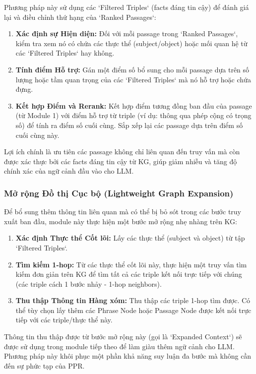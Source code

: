 \documentclass[../main.tex]{subfiles}
\begin{document}
Phương pháp này sử dụng các `Filtered Triples` (facts đáng tin cậy) để đánh giá lại và điều chỉnh thứ hạng của `Ranked Passages`:
\begin{enumerate}
    \item \textbf{Xác định sự Hiện diện:} Đối với mỗi passage trong `Ranked Passages`, kiểm tra xem nó có chứa các thực thể (subject/object) hoặc mối quan hệ từ các `Filtered Triples` hay không.
    \item \textbf{Tính điểm Hỗ trợ:} Gán một điểm số bổ sung cho mỗi passage dựa trên số lượng hoặc tầm quan trọng của các `Filtered Triples` mà nó hỗ trợ hoặc chứa đựng.
    \item \textbf{Kết hợp Điểm và Rerank:} Kết hợp điểm tương đồng ban đầu của passage (từ Module 1) với điểm hỗ trợ từ triple (ví dụ: thông qua phép cộng có trọng số) để tính ra điểm số cuối cùng. Sắp xếp lại các passage dựa trên điểm số cuối cùng này.
\end{enumerate}
Lợi ích chính là ưu tiên các passage không chỉ liên quan đến truy vấn mà còn được xác thực bởi các facts đáng tin cậy từ KG, giúp giảm nhiễu và tăng độ chính xác của ngữ cảnh đầu vào cho LLM.

\subsubsection{Mở rộng Đồ thị Cục bộ (Lightweight Graph Expansion)}

Để bổ sung thêm thông tin liên quan mà có thể bị bỏ sót trong các bước truy xuất ban đầu, module này thực hiện một bước mở rộng nhẹ nhàng trên KG:
\begin{enumerate}
    \item \textbf{Xác định Thực thể Cốt lõi:} Lấy các thực thể (subject và object) từ tập `Filtered Triples`.
    \item \textbf{Tìm kiếm 1-hop:} Từ các thực thể cốt lõi này, thực hiện một truy vấn tìm kiếm đơn giản trên KG để tìm tất cả các triple kết nối trực tiếp với chúng (các triple cách 1 bước nhảy - 1-hop neighbors).
    \item \textbf{Thu thập Thông tin Hàng xóm:} Thu thập các triple 1-hop tìm được. Có thể tùy chọn lấy thêm các Phrase Node hoặc Passage Node được kết nối trực tiếp với các triple/thực thể này.
\end{enumerate}
Thông tin thu thập được từ bước mở rộng này (gọi là `Expanded Context`) sẽ được sử dụng trong module tiếp theo để làm giàu thêm ngữ cảnh cho LLM. Phương pháp này khôi phục một phần khả năng suy luận đa bước mà không cần đến sự phức tạp của PPR.
\end{document}

